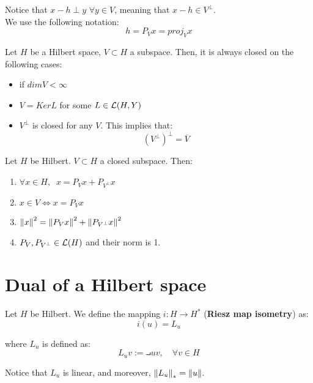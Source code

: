 \begin{fremark}
    Notice that $x - h \perp y$ $\forall y \in V$, meaning that $x-h \in V^{\perp}$.\\

    We use the following notation:
    $$h = P_V x = proj_V x$$
\end{fremark}

\begin{fremark}
    Let $H$ be a Hilbert space, $V \subset H$ a subspace. Then, it is always closed on the following
    cases:
    \vspace{1em}
    \begin{itemize}
        \item if $dim V < \infty$
        \vspace{1em}
        \item $V = Ker L$ for some $L \in \mathcal{L}(H, Y)$
        \vspace{1em}
        \item $V^{\perp}$ is closed for any $V$. This implies that:
        $$(V^{\perp})^{\perp} = \overline{V}$$
    \end{itemize}
\end{fremark}

\vspace{1em}

\begin{ftheorem}
    Let $H$ be Hilbert. $V \subset H$ a closed subspace. Then:
    \vspace{1em}
    \begin{enumerate}[label=(\roman*)]
        \item $\forall x \in H, \; \; x = P_V x + P_{V^{\perp}} x$
        \vspace{1em}
        \item $x \in V \iff x = P_V x$
        \vspace{1em}
        \item $\left\|x\right\|^2 = \left\|P_V x\right\|^2 + \left\|P_{V^{\perp}} x\right\|^2$
        \vspace{1em}
        \item $P_V, P_{V^{\perp}} \in \mathcal{L}(H)$ and their norm is 1.
    \end{enumerate}
\end{ftheorem}

\section{Dual of a Hilbert space}

\begin{fdefinition}
    Let $H$ be Hilbert. We define the mapping $i: H \to H^*$ (\textbf{Riesz map isometry}) as:
    $$i(u) = L_u$$

    where $L_u$ is defined as:
    $$L_u v := \intprod{u}{v}, \quad \forall v \in H$$

    Notice that $L_u$ is linear, and moreover, $\left\|L_u\right\|_* = \left\|u\right\|$.
\end{fdefinition}

